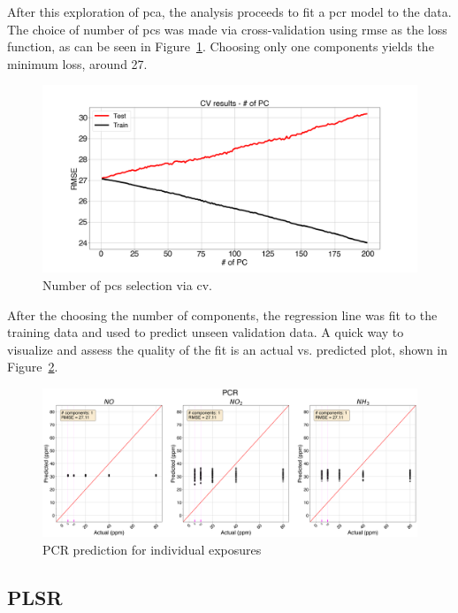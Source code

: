 After this exploration of \acrshort{pca}, the analysis proceeds to fit a \acrshort{pcr} model to the data. The choice of number of \acrshort{pc}s was made via cross-validation using \acrshort{rmse} as the loss function, as can be seen in Figure~\ref{fig:pcr-cv-exposures}. Choosing only one components yields the minimum loss, around 27.

\begin{figure}[h]
	\centering
	\includegraphics[width=1\textwidth]{../figures/pcr-cv-exposures.png}
	\caption{Number of \acrshort{pc}s selection via \acrshort{cv}.}
	\label{fig:pcr-cv-exposures}
\end{figure}

After the choosing the number of components, the regression line was fit to the training data and used to predict unseen validation data. A quick way to visualize and assess the quality of the fit is an actual vs. predicted plot,  shown in Figure~\ref{fig:pcr-exposures}.

\begin{figure}[h]
	\centering
	\includegraphics[width=1\textwidth]{../figures/pcr-exposures.png}
	\caption{PCR prediction for individual exposures}
	\label{fig:pcr-exposures}
\end{figure}

\newpage
\subsection{PLSR}

